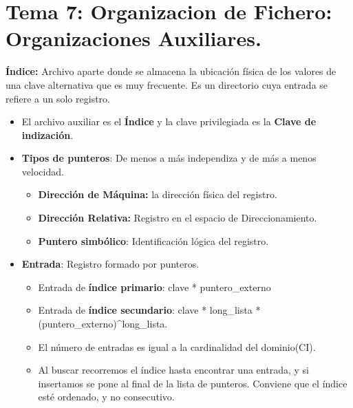 \documentclass[12pt, twoside, openright]{report} %
\begin{document}
  
\chapter{Tema 7: Organizacion de Fichero: Organizaciones Auxiliares.}



  
  \textbf{Índice:} Archivo aparte donde se almacena la ubicación física
  de los valores de una clave alternativa que es muy frecuente. Es un
  directorio cuya entrada se refiere a un solo registro.
  

  \begin{itemize}
  \item El archivo auxiliar es el \textbf{Índice} y la clave privilegiada es
    la \textbf{Clave de indización}.
    
  \item \textbf{Tipos de punteros}: De menos a más independiza y de más a
    menos velocidad.
    

    \begin{itemize}
    \item \textbf{Dirección de Máquina:} la dirección física del registro.
      
    \item \textbf{Dirección Relativa:} Registro en el espacio de
      Direccionamiento.
      
    \item \textbf{Puntero simbólico}: Identificación lógica del registro.
      
    \end{itemize}
  \item \textbf{Entrada}: Registro formado por punteros.
    

    \begin{itemize}
    \item Entrada de \textbf{índice primario}: clave * puntero\_externo
      
    \item Entrada de \textbf{índice secundario}: clave * long\_lista *
      (puntero\_externo)\^{}long\_lista.
      
    \item El número de entradas es igual a la cardinalidad del dominio(CI).
      
    \item Al buscar recorremos el índice hasta encontrar una entrada, y si
      insertamos se pone al final de la lista de punteros. Conviene que
      el índice esté ordenado, y no consecutivo.
      

\end{itemize}
\end{itemize}
\end{document}
